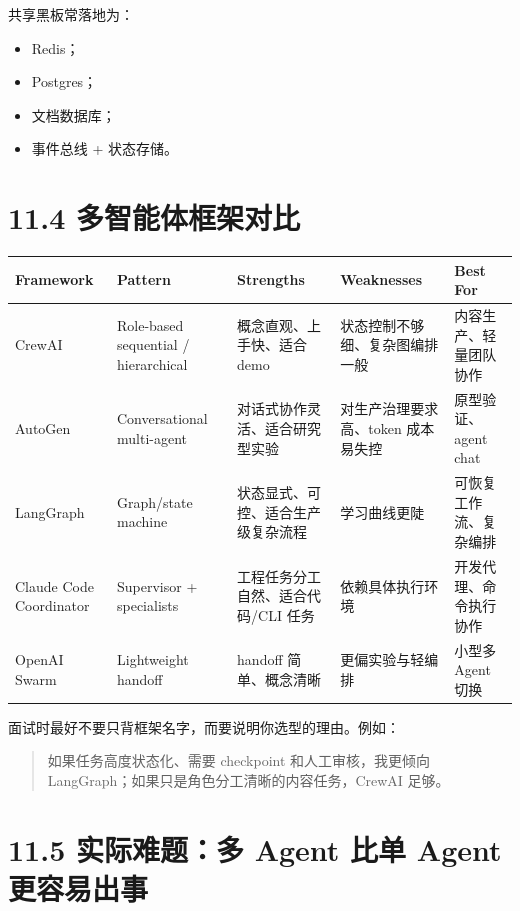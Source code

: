 共享黑板常落地为：


\begin{itemize}[leftmargin=2em]
\item Redis；
\item Postgres；
\item 文档数据库；
\item 事件总线 + 状态存储。
\end{itemize}

\section{11.4 多智能体框架对比}

\begingroup
\scriptsize
\setlength{\tabcolsep}{3pt}
\begin{longtable}{|p{}|p{}|p{}|p{}|p{}|}
\hline
Framework & Pattern & Strengths & Weaknesses & Best For \\ \hline
CrewAI & Role-based sequential / hierarchical & 概念直观、上手快、适合 demo & 状态控制不够细、复杂图编排一般 & 内容生产、轻量团队协作 \\ \hline
AutoGen & Conversational multi-agent & 对话式协作灵活、适合研究型实验 & 对生产治理要求高、token 成本易失控 & 原型验证、agent chat \\ \hline
LangGraph & Graph/state machine & 状态显式、可控、适合生产级复杂流程 & 学习曲线更陡 & 可恢复工作流、复杂编排 \\ \hline
Claude Code Coordinator & Supervisor + specialists & 工程任务分工自然、适合代码/CLI 任务 & 依赖具体执行环境 & 开发代理、命令执行协作 \\ \hline
OpenAI Swarm & Lightweight handoff & handoff 简单、概念清晰 & 更偏实验与轻编排 & 小型多 Agent 切换 \\ \hline
\end{longtable}
\endgroup

面试时最好不要只背框架名字，而要说明你选型的理由。例如：


\begin{quote}
如果任务高度状态化、需要 checkpoint 和人工审核，我更倾向 LangGraph；如果只是角色分工清晰的内容任务，CrewAI 足够。\\
\end{quote}

\section{11.5 实际难题：多 Agent 比单 Agent 更容易出事}


